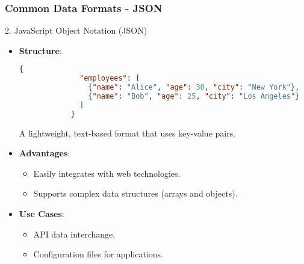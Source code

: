 \documentclass[aspectratio=169]{beamer}
\begin{document}
\begin{frame}[fragile]
    \frametitle{Common Data Formats - JSON}
    \begin{block}{2. JavaScript Object Notation (JSON)}
        \begin{itemize}
            \item \textbf{Structure}:
            \begin{lstlisting}[language=json]
            {
              "employees": [
                {"name": "Alice", "age": 30, "city": "New York"},
                {"name": "Bob", "age": 25, "city": "Los Angeles"}
              ]
            }
            \end{lstlisting}
            A lightweight, text-based format that uses key-value pairs.

            \item \textbf{Advantages}:
            \begin{itemize}
                \item Easily integrates with web technologies.
                \item Supports complex data structures (arrays and objects).
            \end{itemize}

            \item \textbf{Use Cases}:
            \begin{itemize}
                \item API data interchange.
                \item Configuration files for applications.
            \end{itemize}
        \end{itemize}
    \end{block}
\end{frame}
\end{document}
